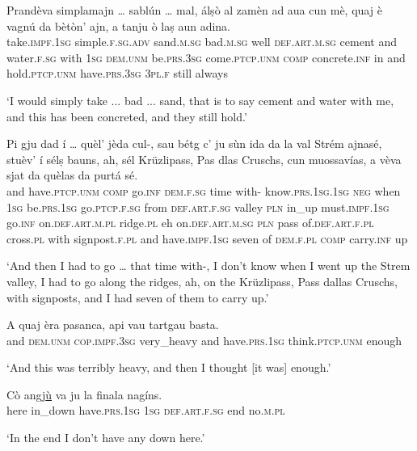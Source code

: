 \begin{linenumbers}
\gll  Prandèva simplamajn … sablún … mal, álṣò al zamèn ad aua cun mè, quaj è vagnú da bètòn’ ajn, a tanju ò laṣ aun adina. \\
 take.\textsc{impf.1sg} simple.\textsc{f.sg.adv} {} sand.\textsc{m.sg} {} bad.\textsc{m.sg} well \textsc{def.art.m.sg} cement and water.\textsc{f.sg} with \textsc{1sg} \textsc{dem.unm} be.\textsc{prs.3sg} come.\textsc{ptcp.unm} \textsc{comp} concrete.\textsc{inf} in and hold.\textsc{ptcp.unm} have.\textsc{prs.3sg} \textsc{3pl.f} still always \\
\end{linenumbers}
\medskip
\glt `I would simply take ... bad ... sand, that is to say cement and water with me, and this has been concreted, and they still hold.'
\medskip

\begin{linenumbers}
\gll  Pi gju dad í … quèl’ jèda cul-, sau bétg c’ ju sùn ida da la val Strém ajnasé, stuèv’ í sélṣ bauns, ah, sél Krüzlipass, Pas dlas Cruschs, cun muossavías, a vèva sjat da quèlas da purtá sé.  \\
and have.\textsc{ptcp.unm} \textsc{comp} go.\textsc{inf} {} \textsc{dem.f.sg} time  with- know.\textsc{prs.1sg.1sg} \textsc{neg} when \textsc{1sg} be.\textsc{prs.1sg} go.\textsc{ptcp.f.sg} from \textsc{def.art.f.sg} valley \textsc{pln} in\_up must.\textsc{impf.1sg} go.\textsc{inf} on.\textsc{def.art.m.pl} ridge.\textsc{pl} eh on.\textsc{def.art.m.sg} \textsc{pln} pass of.\textsc{def.art.f.pl} cross.\textsc{pl} with signpost.\textsc{f.pl} and have.\textsc{impf.1sg} seven of  \textsc{dem.f.pl} \textsc{comp} carry.\textsc{inf} up \\
\end{linenumbers}
\medskip
\glt `And then I had to go … that time with-, I don’t know when I went up the Strem valley, I had to go along the ridges, ah, on the Krüzlipass, Pass dallas Cruschs, with signposts, and I had seven of them to carry up.'
\medskip

\begin{linenumbers}
\gll  A quaj èra pasanca, api vau tartgau basta.  \\
and \textsc{dem.unm} \textsc{cop.impf.3sg} very\_heavy and have.\textsc{prs.1sg} think.\textsc{ptcp.unm} enough  \\
\end{linenumbers}
\medskip
\glt `And this was terribly heavy, and then I thought [it was] enough.'
\medskip

\begin{linenumbers}
\gll  Cò angj\underline{ù} va ju la finala nagíns.  \\
here in\_down have.\textsc{prs.1sg} \textsc{1sg} \textsc{def.art.f.sg} end no.\textsc{m.pl}  \\
\end{linenumbers}
\medskip
\glt `In the end I don’t have any down here.'
\medskip

